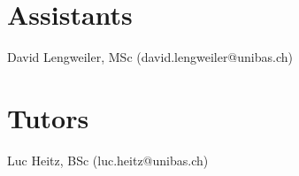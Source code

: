 \documentclass[runningheads,a4paper]{llncs}
\newenvironment{produceProceedings}{}{}
\begin{document}
\begin{produceProceedings}
	\section*{Assistants}
	David Lengweiler, MSc (david.lengweiler@unibas.ch)
	\section*{Tutors}
	Luc Heitz, BSc (luc.heitz@unibas.ch)
	\tableofcontents
\end{produceProceedings}
	
%
\mainmatter
%


\end{document}
